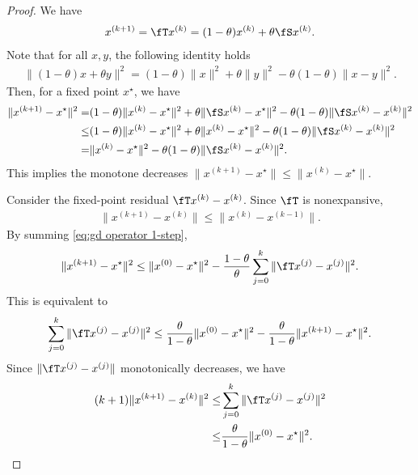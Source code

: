 \documentclass{article}
\begin{document}
\begin{proof}
    We have
    \begin{align}
        x^{(k+1)} = \fT x^{(k)} = (1-\theta) x^{(k)} + \theta \fS x^{(k)}.
    \end{align}
    Note that for all $x, y$, the following identity holds
    \begin{align}
        \|(1-\theta)x + \theta y\|^2 = (1-\theta) \|x\|^2 + \theta \|y\|^2 - \theta(1-\theta) \|x-y\|^2.
    \end{align}
    Then, for a fixed point $x^\star$, we have
    \begin{align}
        \|x^{(k+1)} - x^\star\|^2 
        =& (1-\theta) \|x^{(k)} - x^\star\|^2 + \theta \|\fS x^{(k)} - x^\star\|^2 - \theta (1-\theta) \|\fS x^{(k)} - x^{(k)}\|^2\\
        \leq & (1-\theta) \|x^{(k)} - x^\star\|^2 + \theta \|x^{(k)} - x^\star\|^2 - \theta (1-\theta) \|\fS x^{(k)} - x^{(k)}\|^2\\
        = &  \|x^{(k)} - x^\star\|^2 - \theta (1-\theta) \|\fS x^{(k)} - x^{(k)}\|^2. \label{eq:gd operator 1-step}
    \end{align}
    This implies the monotone decreases $\|x^{(k+1)}-x^\star\| \leq \|x^{(k)} - x^\star\|$.

    Consider the fixed-point residual $\fT x^{(k)} - x^{(k)}$.
    Since $\fT$ is nonexpansive,
    \begin{align}
        \|x^{(k+1)} - x^{(k)}\| \leq \|x^{(k)} - x^{(k-1)}\|.
    \end{align}
    By summing \eqref{eq:gd operator 1-step},
    \begin{align}
        \|x^{(k+1)} - x^{\star}\|^2 \leq \|x^{(0)} - x^\star\|^2 - \frac{1-\theta}{\theta} \sum_{j=0}^k \|\fT x^{(j)} - x^{(j)}\|^2.
    \end{align}
    This is equivalent to
    \begin{align}
        \sum_{j=0}^k \|\fT x^{(j)} - x^{(j)}\|^2 \leq \frac{\theta}{1-\theta} \|x^{(0)}- x^\star\|^2 - \frac{\theta}{1-\theta}\|x^{(k+1)}-x^\star\|^2.
    \end{align}
    Since $\|\fT x^{(j)} - x^{(j)}\|$ monotonically decreases, we have
    \begin{align}
        (k+1)\|x^{(k+1)} - x^{(k)}\|^2 \leq& \sum_{j=0}^k \|\fT x^{(j)} - x^{(j)}\|^2\\
        \leq& \frac{\theta}{1-\theta} \|x^{(0)}- x^\star\|^2.
    \end{align}
\end{proof}
\end{document}
